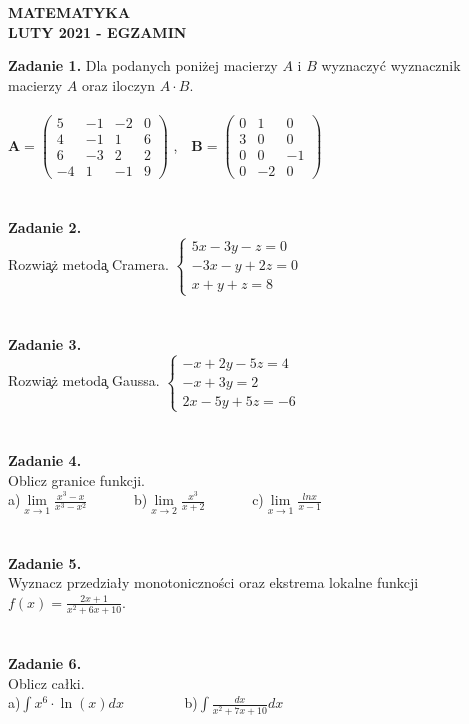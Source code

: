 \documentclass{report}
\begin{document}
\begin{center}
\textbf{MATEMATYKA \\LUTY 2021 - EGZAMIN}
\end{center}
\textbf{Zadanie 1.} 
Dla podanych poniżej macierzy $A$ i $B$ wyznaczyć wyznacznik macierzy $A$ oraz iloczyn $A\cdot B$.
\\\\
$
\mathbf{A} =
\left( \begin{array}{cccc}
5 & -1& -2 & 0\\
4 & -1&1 & 6\\
6 & -3& 2 & 2\\
-4 & 1 & -1 & 9 
\end{array} \right)
$ ,\ \ 
$
\mathbf{B} =
\left( \begin{array}{ccc}
0 & 1& 0\\
3 & 0& 0\\
0 & 0& -1\\
0 & -2& 0
\end{array} \right)
$
\\\\\\\textbf{Zadanie 2.} 
\\Rozwi\c{a}\.z metod\c{a} Cramera. 
$
\left\{ \begin{array}{ll}
5x-3y-z=0\\
-3x-y+2z=0\\
x+y+z=8
\end{array} \right.
$
\\\\\\\textbf{Zadanie 3.} 
\\Rozwi\c{a}\.z metod\c{a} Gaussa. 
$
\left\{ \begin{array}{ll}
-x+2y-5z=4\\
-x+3y=2\\
2x-5y+5z=-6
\end{array} \right.
$
\\\\\\\textbf{Zadanie 4.}
\\Oblicz granice funkcji.
\\a)$\lim\limits_{x\to 1}\frac{x^3-x}{x^3-x^2}$
\ \ \ \ \ \  b)$\lim\limits_{x\to 2}\frac{x^3}{x+2}$
\ \ \ \ \ \ c)$\lim\limits_{x\to 1} \frac{lnx}{x-1}$
\\\\\\\textbf{Zadanie 5.}
\\Wyznacz przedziały monotoniczności oraz ekstrema lokalne funkcji $f(x)=\frac{2x+1}{x^2+6x+10}$.
\\\\\\\textbf{Zadanie 6.}
\\Oblicz całki. 
\\a)$\int x^6\cdot \ln(x) dx$ \ \ \ \ \ \ \ \ b)$\int \frac{dx}{x^2+7x+10} dx$
\end{document}

